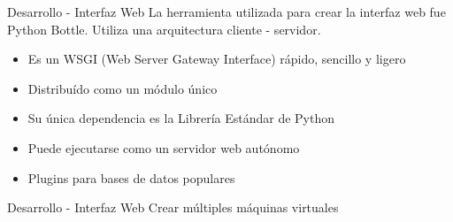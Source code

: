 
\begin{frame}{Desarrollo - Interfaz Web}
    \vspace{-1.5cm}
    La herramienta utilizada para crear la interfaz web fue Python Bottle.
    Utiliza una arquitectura cliente - servidor.
    \begin{itemize}
        \item Es un WSGI (Web Server Gateway Interface) rápido, sencillo y ligero
        \item Distribuído como un módulo único
        \item Su única dependencia es la Librería Estándar de Python
        \item Puede ejecutarse como un servidor web autónomo
        \item Plugins para bases de datos populares
    \end{itemize}
    
\end{frame}

\begin{frame}{Desarrollo - Interfaz Web}
    \vspace{0cm} {Crear múltiples máquinas virtuales}
    \vspace{0cm}
    \begin{figure}[ht]
       \centering
    \end{figure}

\end{frame}

